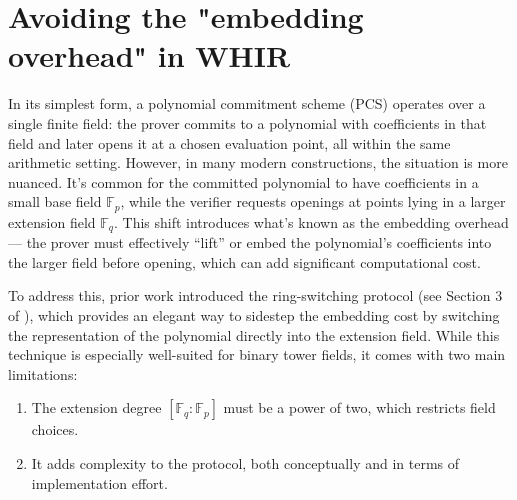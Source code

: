 \documentclass{article}
\newcommand{\Fp}{\mathbb F_p}
\newcommand{\Fq}{\mathbb F_q}
\begin{document}




\section{Avoiding the "embedding overhead" in WHIR}\label{embedding_overhead}

In its simplest form, a polynomial commitment scheme (PCS) operates over a single finite field: the prover commits to a polynomial with coefficients in that field and later opens it at a chosen evaluation point, all within the same arithmetic setting. However, in many modern constructions, the situation is more nuanced. It’s common for the committed polynomial to have coefficients in a small base field $\Fp$, while the verifier requests openings at points lying in a larger extension field $\Fq$. This shift introduces what’s known as the embedding overhead — the prover must effectively “lift” or embed the polynomial’s coefficients into the larger field before opening, which can add significant computational cost.

To address this, prior work introduced the ring-switching protocol (see Section 3 of \cite{fri_binius}), which provides an elegant way to sidestep the embedding cost by switching the representation of the polynomial directly into the extension field. While this technique is especially well-suited for binary tower fields, it comes with two main limitations:
\begin{enumerate}
    \item The extension degree $[\Fq:\Fp]$ must be a power of two, which restricts field choices.
    \item It adds complexity to the protocol, both conceptually and in terms of implementation effort.
\end{enumerate}
\end{document}
